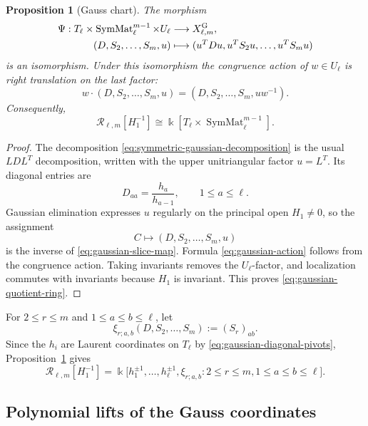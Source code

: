 \documentclass[11pt]{amsart}
\newtheorem{proposition}[theorem]{Proposition}
\theoremstyle{definition}
\theoremstyle{remark}
\newcommand{\kk}{\Bbbk}
\newcommand{\SymMat}{\operatorname{SymMat}}
\newcommand{\cR}{\mathcal R}
\begin{document}
\begin{proposition}[Gauss chart]
\label{prop:gaussian-slice}
The morphism
\begin{align}
 \Psi:T_\ell\times\SymMat_\ell^{m-1}\times U_\ell
 &\longrightarrow X_{\ell,m}^{\mathrm G},
 \notag\\
 (D,S_2,\ldots,S_m,u)
 &\longmapsto
 (u^TDu,u^TS_2u,\ldots,u^TS_mu)
 \label{eq:gaussian-slice-map}
\end{align}
is an isomorphism.  Under this isomorphism the congruence action of
$w\in U_\ell$ is right translation on the last factor:
\begin{equation}
 w\cdot(D,S_2,\ldots,S_m,u)
 =(D,S_2,\ldots,S_m,uw^{-1}).
 \label{eq:gaussian-action}
\end{equation}
Consequently,
\begin{equation}
 \cR_{\ell,m}[H_1^{-1}]
 \cong\kk[T_\ell\times\SymMat_\ell^{m-1}].
 \label{eq:gaussian-quotient-ring}
\end{equation}
\end{proposition}

\begin{proof}
The decomposition \eqref{eq:symmetric-gaussian-decomposition} is the usual
$LDL^T$ decomposition, written with the upper unitriangular factor
$u=L^T$.  Its diagonal entries are
\begin{equation}
 D_{aa}=\frac{h_a}{h_{a-1}},
 \qquad 1\le a\le\ell.
 \label{eq:gaussian-diagonal-pivots}
\end{equation}
Gaussian elimination expresses $u$ regularly on the principal open
$H_1\ne0$, so the assignment
\[ C\longmapsto(D,S_2,\ldots,S_m,u) \]
is the inverse of \eqref{eq:gaussian-slice-map}.  Formula
\eqref{eq:gaussian-action} follows from the congruence action.  Taking
invariants removes the $U_\ell$-factor, and localization commutes with
invariants because $H_1$ is invariant.  This proves
\eqref{eq:gaussian-quotient-ring}.
\end{proof}

For $2\le r\le m$ and $1\le a\le b\le\ell$, let
\[ \xi_{r;a,b}(D,S_2,\ldots,S_m):=(S_r)_{ab}. \]
Since the $h_i$ are Laurent coordinates on $T_\ell$ by
\eqref{eq:gaussian-diagonal-pivots}, Proposition~\ref{prop:gaussian-slice}
gives
\begin{equation}
 \cR_{\ell,m}[H_1^{-1}]
 =\kk\bigl[
 h_1^{\pm1},\ldots,h_\ell^{\pm1},
 \xi_{r;a,b}:2\le r\le m,
 1\le a\le b\le\ell
 \bigr].
 \label{eq:localized-ring-xi}
\end{equation}

\subsection{Polynomial lifts of the Gauss coordinates}
\label{subsec:gaussian-coordinate-invariants}
\end{document}
